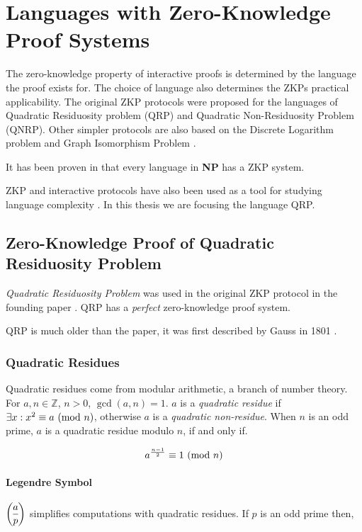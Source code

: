 \section{Languages with Zero-Knowledge Proof Systems}
The zero-knowledge property of interactive proofs is determined by the language the proof exists for.
The choice of language also determines the ZKPs practical applicability.
\bigskip
\newline
The original ZKP protocols \cite{GMR} were proposed for the languages of Quadratic Residuosity problem (QRP) and Quadratic Non-Residuosity Problem (QNRP).
Other simpler protocols are also based on the Discrete Logarithm problem \cite{wu1998secure} and Graph Isomorphism Problem \cite{goldreich2019proofs}.

It has been proven in \cite{GMW} that every language in \textbf{NP} has a ZKP system.

ZKP and interactive protocols have also been used as a tool for studying language complexity \cite{shamir1992ip}.
\bigskip
\newline
In this thesis we are focusing the language QRP.

\subsection{Zero-Knowledge Proof of Quadratic Residuosity Problem}
\textit{Quadratic Residuosity Problem} was used in the original ZKP protocol in the founding paper \cite{GMR}. QRP has a \textit{perfect} zero-knowledge proof system.

QRP is much older than the \cite{GMR} paper, it was first described by Gauss in 1801 \cite{gauss1801disquisitiones}.

\subsubsection{Quadratic Residues} \cite{andrews1994number}
Quadratic residues come from modular arithmetic, a branch of number theory.
\bigskip
\newline
For $a, n \in \mathbb{Z}$, $n > 0$, $\gcd(a, n) = 1 $.
$a$ is a \textit{quadratic residue} if  $\exists x:x^2 \equiv a \ (\mathrm{mod}\ n)$, otherwise $a$ is a \textit{quadratic non-residue}.
\bigskip
\newline
When $n$ is an odd prime, $a$ is a quadratic residue modulo $n$, if and only if.

$$a^{\frac{n-1}{2}} \equiv 1 \ (\mathrm{mod}\ n)$$

\paragraph{Legendre Symbol}
$\dlegendre{a}{p}$ simplifies computations with quadratic residues.
\bigskip
\newline
If $p$ is an odd prime then,

